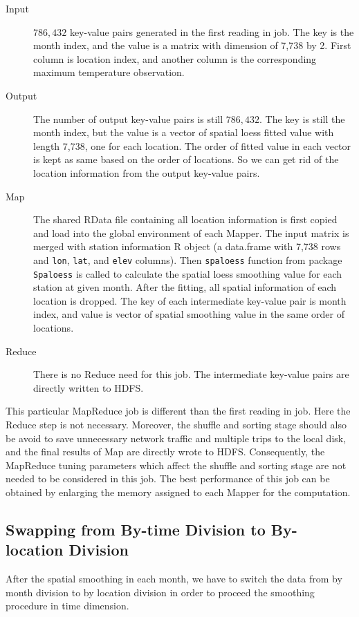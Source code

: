 \begin{description}
  \item[Input] $786,432$ key-value pairs generated in the first reading in job.
  The key is the month index, and the value is a matrix with dimension of 7,738
  by 2. First column is location index, and another column is the corresponding 
  maximum temperature observation.
  \item[Output] The number of output key-value pairs is still $786,432$. The key
  is still the month index, but the value is a vector of spatial loess fitted
  value with length 7,738, one for each location. The order of fitted value in 
  each vector is kept as same based on the order of locations. So we can get rid
  of the location information from the output key-value pairs.
  \item[Map] The shared RData file containing all location information is first 
  copied and load into the global environment of each Mapper. The input matrix
  is merged with station information R object (a data.frame with 7,738 rows and
  \texttt{lon}, \texttt{lat}, and \texttt{elev} columns). Then \texttt{spaloess}
  function from package \texttt{Spaloess} is called to calculate the spatial
  loess smoothing value for each station at given month. After the fitting,
  all spatial information of each location is dropped. The key of each 
  intermediate key-value pair is month index, and value is vector of spatial 
  smoothing value in the same order of locations. 
  \item[Reduce] There is no Reduce need for this job. The intermediate key-value
  pairs are directly written to HDFS.
\end{description}

This particular MapReduce job is different than the first reading in job. Here
the Reduce step is not necessary. Moreover, the shuffle and sorting stage should
also be avoid to save unnecessary network traffic and multiple trips to the local 
disk, and the final results of Map are directly wrote to HDFS. Consequently, the
MapReduce tuning parameters which affect the shuffle and sorting stage are not 
needed to be considered in this job. The best performance of this job can be 
obtained by enlarging the memory assigned to each Mapper for the computation.

\subsection{Swapping from By-time Division to By-location Division}
\label{sec:swaptoloc}
After the spatial smoothing in each month, we have to switch the data from by 
month division to by location division in order to proceed the smoothing procedure
in time dimension. 

